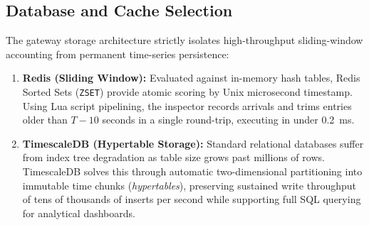 \subsection{Database and Cache Selection}
The gateway storage architecture strictly isolates high-throughput sliding-window accounting from permanent time-series persistence:
\begin{enumerate}
    \item \textbf{Redis (Sliding Window):} Evaluated against in-memory hash tables, Redis Sorted Sets (\texttt{ZSET}) provide atomic scoring by Unix microsecond timestamp. Using Lua script pipelining, the inspector records arrivals and trims entries older than $T - 10$ seconds in a single round-trip, executing in under 0.2~ms.
    \item \textbf{TimescaleDB (Hypertable Storage):} Standard relational databases suffer from index tree degradation as table size grows past millions of rows. TimescaleDB solves this through automatic two-dimensional partitioning into immutable time chunks (\textit{hypertables}), preserving sustained write throughput of tens of thousands of inserts per second while supporting full SQL querying for analytical dashboards.
\end{enumerate}
